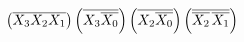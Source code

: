\documentclass[preview]{standalone}
\begin{document}
\begin{align*}
\left(\overline{X_3X_2X_1}\right)\left(\overline{X_3\overline{X_0}}\right)\left(\overline{X_2\overline{X_0}}\right)\left(\overline{\overline{X_2}\hspace{0.05cm}\overline{X_1}}\right)
\end{align*}
\end{document}

